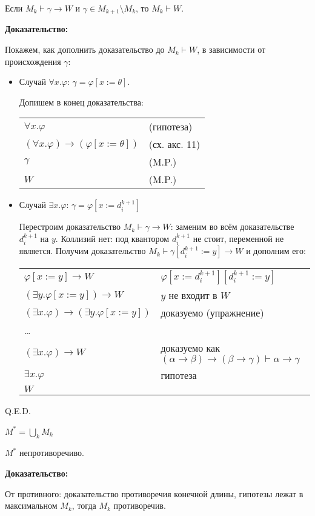 Если $M_k\vdash\gamma\to W$ и $\gamma\in M_{k+1}\setminus M_k$, то $M_k\vdash W$.


\textbf{Доказательство:}

Покажем, как дополнить доказательство до $M_k\vdash W$, в зависимости от происхождения $\gamma$:

\begin{itemize}
\item Случай $\forall x.\varphi$: $\gamma = \varphi[x:=\theta]$.

Допишем в конец доказательства:

\begin{tabular}{ll}
$\forall x.\varphi$ & (гипотеза)\\
$(\forall x.\varphi)\to(\varphi[x:=\theta])$ & (сх. акс. 11)\\
$\gamma$  & (M.P.) \\
$W$ & (M.P.)
\end{tabular}

\item Случай $\exists x.\varphi$: $\gamma = \varphi[x := d^{k+1}_i]$

Перестроим доказательство $M_k\vdash \gamma\to W$:
заменим во всём доказательстве $d^{k+1}_i$ на $y$.
Коллизий нет: под квантором $d^{k+1}_i$ не стоит, переменной не является. 
Получим доказательство $M_k\vdash \gamma[d^{k+1}_i := y]\to W$ и дополним его:

\begin{tabular}{ll}
$\varphi[x := y]\to W$ & $\varphi[x := d^{k+1}_i][d^{k+1}_i := y]$\\
$(\exists y.\varphi[x:=y])\to W$ & $y$ не входит в $W$ \\
$(\exists x.\varphi)\to(\exists y.\varphi[x:=y])$ & доказуемо (упражнение)\\
 \dots \\
$(\exists x.\varphi)\to W$ & доказуемо как $(\alpha\to\beta)\to(\beta\to\gamma)\vdash\alpha\to\gamma$ \\
$\exists x.\varphi$ & гипотеза\\
$W$
\end{tabular}
\end{itemize}
\hfill Q.E.D.

 $M^* = \bigcup_k M_k$

 $M^*$ непротиворечиво.

\textbf{Доказательство:}

 От противного: доказательство противоречия конечной длины, гипотезы лежат в максимальном $M_k$, тогда $M_k$ противоречив.

